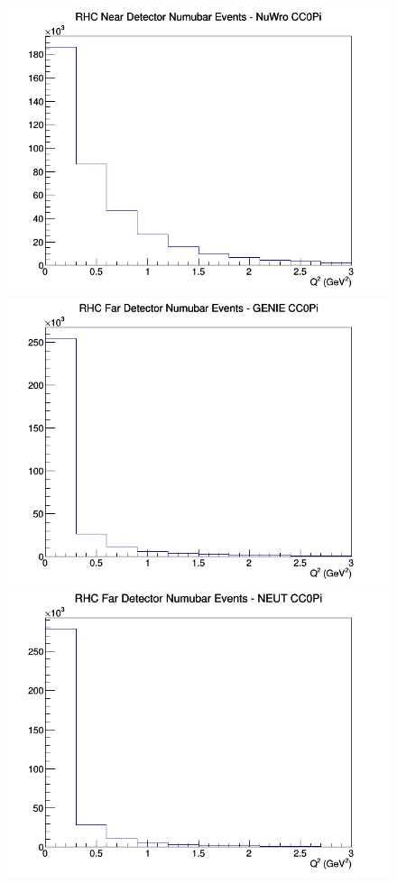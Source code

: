 \documentclass[12pt]{article}
\begin{document}
\begin{figure}[h]
\includegraphics[width=\linewidth]{eff_Q2/LAr/CC0Pi_RHC_ND_numubar_Q2_NuWro.png}
\endminipage
\newline
{}
\includegraphics[width=\linewidth]{eff_Q2/LAr/CC0Pi_RHC_FD_numubar_Q2_GENIE.png}
\endminipage
{}
\includegraphics[width=\linewidth]{eff_Q2/LAr/CC0Pi_RHC_FD_numubar_Q2_NEUT.png}

\end{figure}
\end{document}
